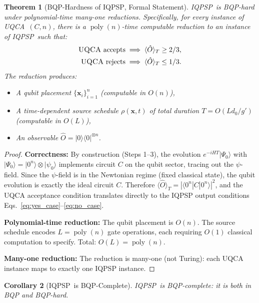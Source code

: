 \documentclass[11pt]{article}
\newtheorem{theorem}{Theorem}[section]
\newtheorem{corollary}[theorem]{Corollary}
\theoremstyle{definition}
\theoremstyle{remark}
\newcommand{\IQPSP}{\textsc{IQPSP}}
\DeclareMathOperator{\poly}{poly}
\begin{document}
\begin{theorem}[BQP-Hardness of \IQPSP, Formal Statement]
\label{thm:bqp_hard}
\IQPSP\ is BQP-hard under polynomial-time many-one reductions.
Specifically, for every instance of \textsc{UQCA}\ $(C, n)$, there is
a $\poly(n)$-time computable reduction to an instance of \IQPSP\ such
that:
\begin{align}
\text{\textsc{UQCA} accepts} &\implies
  \langle\hat{O}\rangle_T \geq 2/3, \label{eq:yes_case} \\
\text{\textsc{UQCA} rejects} &\implies
  \langle\hat{O}\rangle_T \leq 1/3. \label{eq:no_case}
\end{align}
The reduction produces:
\begin{itemize}[nosep]
\item A qubit placement $\{\mathbf{x}_i\}_{i=1}^n$ (computable in $O(n)$),
\item A time-dependent source schedule $\rho(\mathbf{x}, t)$ of total
  duration $T = O(L d_0/g')$ (computable in $O(L)$),
\item An observable $\hat{O} = |0\rangle\langle 0|^{\otimes n}$.
\end{itemize}
\end{theorem}

\begin{proof}
\textbf{Correctness:} By construction (Steps 1--3), the evolution
$e^{-iHT}|\Psi_0\rangle$ with $|\Psi_0\rangle = |0^n\rangle\otimes|\psi_0\rangle$
implements circuit $C$ on the qubit sector, tracing out the $\psi$-field.
Since the $\psi$-field is in the Newtonian regime (fixed classical state),
the qubit evolution is exactly the ideal circuit $C$. Therefore
$\langle\hat{O}\rangle_T = |\langle 0^n | C | 0^n \rangle|^2$, and
the UQCA acceptance condition translates directly to the IQPSP output
conditions Eqs.~\eqref{eq:yes_case}--\eqref{eq:no_case}.

\textbf{Polynomial-time reduction:} The qubit placement is $O(n)$.
The source schedule encodes $L = \poly(n)$ gate operations, each requiring
$O(1)$ classical computation to specify. Total: $O(L) = \poly(n)$.

\textbf{Many-one reduction:} The reduction is many-one (not Turing):
each UQCA instance maps to exactly one IQPSP instance.
\end{proof}

\begin{corollary}[\IQPSP\ is BQP-Complete]
\label{cor:iqpsp_complete}
\IQPSP\ is BQP-complete: it is both in BQP and BQP-hard.
\end{corollary}
\end{document}
